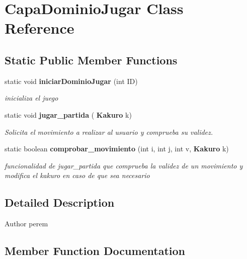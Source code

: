\section{Capa\+Dominio\+Jugar Class Reference}
\label{class_dominio_1_1controladores_1_1_capa_dominio_jugar}
\subsection*{Static Public Member Functions}
\begin{DoxyCompactItemize}
\item 
static void \textbf{ iniciar\+Dominio\+Jugar} (int ID)
\begin{DoxyCompactList}\small\item\em inicializa el juego \end{DoxyCompactList}\item 
static void \textbf{ jugar\+\_\+partida} (\textbf{ Kakuro} k)
\begin{DoxyCompactList}\small\item\em Solicita el movimiento a realizar al usuario y comprueba su validez. \end{DoxyCompactList}\item 
static boolean \textbf{ comprobar\+\_\+movimiento} (int i, int j, int v, \textbf{ Kakuro} k)
\begin{DoxyCompactList}\small\item\em funcionalidad de jugar\+\_\+partida que comprueba la validez de un movimiento y modifica el kakuro en caso de que sea necesario \end{DoxyCompactList}\end{DoxyCompactItemize}


\subsection{Detailed Description}
\begin{DoxyAuthor}{Author}
perem 
\end{DoxyAuthor}


\subsection{Member Function Documentation}
\mbox{\label{class_dominio_1_1controladores_1_1_capa_dominio_jugar_a5a830c6810618f6d7a89a6c288e668d4}} 
